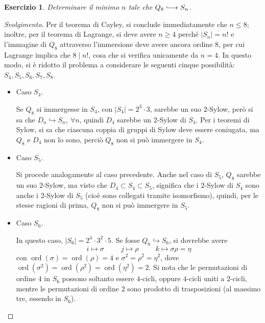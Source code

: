 \documentclass[12pt]{scrartcl}
\theoremstyle{style}
\newtheorem{esercizio}{Esercizio}[section]
\newenvironment{svolgimento}{\renewcommand\qedsymbol{$\blacksquare$}\begin{proof}[Svolgimento]}{\end{proof}}
\numberwithin{equation}{subsection}
\newcommand{\longhookrightarrow}{\lhook\joinrel\longrightarrow}
\begin{document}
\begin{esercizio}
Determinare il minimo $n$ tale che $ Q_8 \longhookrightarrow S_n$.
\end{esercizio}
\begin{svolgimento}
	Per il teorema di Cayley, si conclude immediatamente che $n\le 8$; inoltre, per il teorema di Lagrange, si deve avere $n \ge 4$ perch\'e $\lvert S_n \rvert  = n!$ e l'immagine di $Q_8$ attraverso l'immersione deve avere ancora ordine $8$, per cui Lagrange implica che $8  \mid  n!$, cosa che si verifica unicamente da $n = 4$.
	In questo modo, si \`e ridotto il problema a considerare le seguenti cinque possibilit\`a: $S_4,S_5,S_6,S_7,S_8$.
	\begin{itemize}
		\item Caso $S_4$.

			Se $Q_8$ si immergesse in $S_4$, con $\lvert S_4 \rvert =2^3 \cdot 3$, sarebbe un suo $2$-Sylow, per\`o si sa che $D_n \hookrightarrow S_n , \ \forall n$, quindi $D_4$ sarebbe un $2$-Sylow di $S_4$.
			Per i teoremi di Sylow, si sa che ciascuna coppia di gruppi di Sylow deve essere coniugata, ma $Q_8$ e $D_4$ non lo sono, perci\`o $Q_8$ non si pu\`o immergere in $S_4$.
		\item Caso $S_5$.

			Si procede analogamente al caso precedente.
			Anche nel caso di $S_5$, $Q_8$ sarebbe un suo $2$-Sylow, ma visto che $D_4 \subset S_4 \subset S_5$, significa che i $2$-Sylow di $S_4$ sono anche i $2$-Sylow di $S_5$ (cio\`e sono collegati tramite isomorfismo), quindi, per le stesse ragioni di prima, $Q_8$ non si pu\`o immergere in $S_5$.
		\item Caso $S_6$.

			In questo caso, $\lvert S_6 \rvert = 2^4 \cdot 3^2 \cdot 5$.
			Se fosse $Q_8\hookrightarrow S_6$, si dovrebbe avere 
			\[
			i\longmapsto \sigma  \hspace{1cm} j \longmapsto \rho  \hspace{1cm}k \longmapsto \sigma \rho  = \eta
			\] 
			con $\operatorname{ord}(\sigma ) =\operatorname{ord}(\rho ) =4$ e $\sigma ^2 = \rho ^2 = \eta^2$, dove $\operatorname{ord}(\sigma ^2) =\operatorname{ord}(\rho ^2) = \operatorname{ord}(\eta^2) = 2$.
			Si nota che le permutazioni di ordine $4$ in $S_6$ possono soltanto essere $4$-cicli, oppure $4$-cicli uniti a $2$-cicli, mentre le permutazioni di ordine $2$ sono prodotto di trasposizioni (al massimo tre, essendo in $S_6$).


\end{itemize}
\end{svolgimento}
\end{document}
